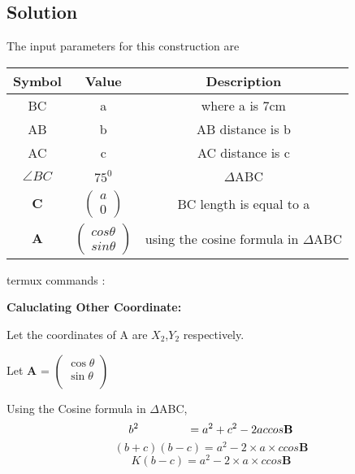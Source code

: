\documentclass[10pt,a4paper]{report}
\newcommand{\myvec}[1]{\ensuremath{\begin{pmatrix}#1\end{pmatrix}}}
\let\vec\mathbf
\begin{document}
\begin{multicols}{2}
\section{Solution}
The input parameters for this construction are
\begin{center}
\begin{tabular}{|c|c|c|}
	\hline
	\textbf{Symbol}&\textbf{Value}&\textbf{Description}\\
	\hline
	BC & a & where a is 7cm\\
	\hline
	AB & b & AB distance is b \\
	\hline 
	AC & c & AC distance is c \\
	\hline
	$\angle{BC}$ & $75^0$ &  $\Delta$ABC \\
	\hline
	$\vec{C}$ & $\myvec{a\\0}$ & BC length is equal to a\\
	\hline
	$\vec{A}$ & $\myvec{ cos\theta \\ sin\theta}$ & using the cosine formula in $\Delta$ABC\\
	\hline
\end{tabular}
\end{center}
\raggedright {termux commands :}
\begin{center}
\end{center}
\raggedright\textbf{Caluclating Other Coordinate: } \\
\raggedright Let the coordinates of A are $X_{2}$,$Y_{2}$ respectively. \\
  \raggedright Let \textbf{A} =
  $\begin{pmatrix} 
 \cos \theta\\
  \sin\theta \\
\end{pmatrix}$ \\
\raggedright Using the Cosine formula in  $\Delta$ABC, \\ \vspace{3mm}
\begin{equation}
{b}^2\hspace{1.5cm}= {a}^2 + {c}^2 - 2accos\vec{B}
\end{equation}
\begin{equation}
(b+c)(b-c) = {a}^2- 2 \times a \times ccos\vec{B}
\end{equation}
\begin{equation}
K(b-c) = {a}^2- 2 \times a \times ccos\vec{B}
\end{equation}
\begin{equation}

\end{equation}
\end{multicols}
\end{document}
